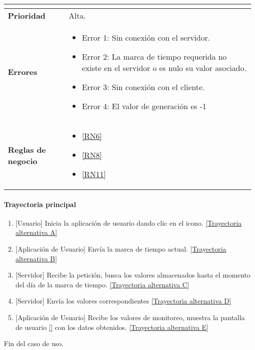 \begin{longtable}{|J{5cm}|J{10.3cm}|}
\begin{itemize}
		\end{itemize} \\ \hline 
	\textbf{Prioridad} & 
		Alta. \\ \hline
	\textbf{Errores} & 
		\begin{itemize}
		    \item \label{CU5:Error1} Error 1: Sin conexión con el servidor.
			\item \label{CU5:Error2} Error 2: La marca de tiempo requerida no existe en el servidor o es nulo su valor asociado.
		    \item \label{CU5:Error3} Error 3: Sin conexión con el cliente.
		    \item \label{CU5:Error3} Error 4: El valor de generación es -1
		\end{itemize} \\ \hline
	\textbf{Reglas de negocio} & 
		\begin{itemize}
		    \item \ref{RN6}
			\item \ref{RN8}
			\item \ref{RN11}
		\end{itemize} \\ \hline

\end{longtable}

\paragraph{Trayectoria principal}
    \label{SUB-M-CU1.5:TP}
	\begin{enumerate}
	    \item {[Usuario]} Inicia la aplicación de usuario dando clic en el icono. \hyperref[SUB-M-CU5:TA]{[Trayectoria alternativa A]}
	    \item {[Aplicación de Usuario]} Envía la marca de tiempo actual. \hyperref[SUB-M-CU5:TB]{[Trayectoria alternativa B]} 
	    \item {[Servidor]} Recibe la petición, busca los valores almacenados hasta el momento del día de la marca de tiempo. \hyperref[SUB-M-CU5:TC]{[Trayectoria alternativa C]}
	    \item {[Servidor]} Envía los valores correspondientes \hyperref[SUB-M-CU5:TD]{[Trayectoria alternativa D]} 
	    \item {[Aplicación de Usuario]} Recibe los valores de monitoreo, muestra la pantalla de usuario \ref{} con los datos obtenidos. \hyperref[SUB-M-CU5:TE]{[Trayectoria alternativa E]}
	\end{enumerate}
	Fin del caso de uso.


